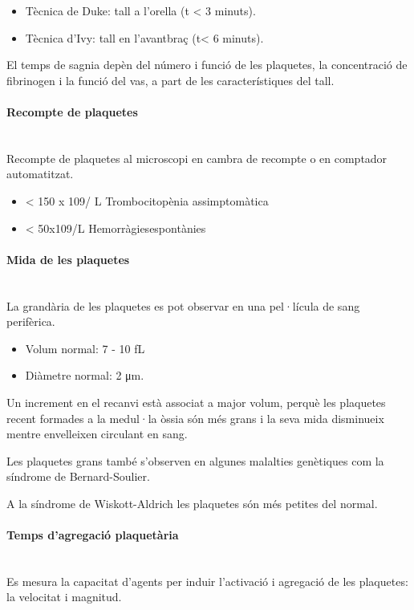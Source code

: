 \begin{itemize}
\item Tècnica de Duke: tall a l'orella (t < 3 minuts).
\item Tècnica d’Ivy: tall en l’avantbraç (t< 6 minuts).
\end{itemize}

El temps de sagnia depèn del número i funció de les plaquetes, la
concentració de fibrinogen i la funció del vas, a part de les
característiques del tall.

\paragraph{Recompte de plaquetes} \hfill \\
Recompte de plaquetes al microscopi en cambra de recompte o en
comptador automatitzat.
\begin{itemize}
\item < 150 x 109/ L Trombocitopènia assimptomàtica 
\item < 50x109/L Hemorràgiesespontànies
\end{itemize}

\paragraph{Mida de les plaquetes} \hfill \\
La grandària de les plaquetes es pot observar en una pel·lícula de
sang perifèrica.
\begin{itemize}
\item  Volum normal: 7 - 10 fL
\item  Diàmetre normal: 2 μm.
\end{itemize}

Un increment en el recanvi està associat a major volum, perquè les
plaquetes recent formades a la medul·la òssia són més grans i la seva
mida disminueix mentre envelleixen circulant en sang.

Les plaquetes grans també s’observen en algunes malalties genètiques
com la síndrome de Bernard-Soulier.

A la síndrome de Wiskott-Aldrich les plaquetes són més petites del
normal.


\paragraph{Temps d'agregació plaquetària} \hfill \\
Es mesura la capacitat d’agents per induir l’activació i agregació de
les plaquetes: la velocitat i magnitud.

